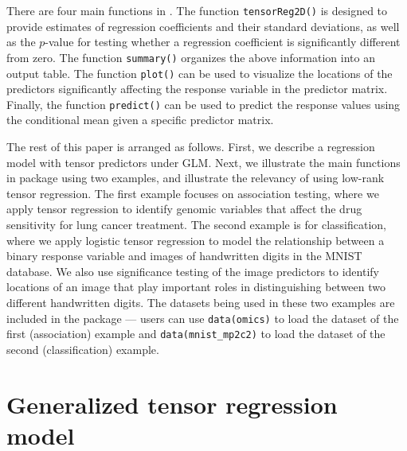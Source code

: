 There are four main functions in . The function
\texttt{tensorReg2D()} is designed to provide estimates of regression
coefficients and their standard deviations, as well as the \(p\)-value
for testing whether a regression coefficient is significantly different
from zero. The function \texttt{summary()} organizes the above
information into an output table. The function \texttt{plot()} can be
used to visualize the locations of the predictors significantly
affecting the response variable in the predictor matrix. Finally, the
function \texttt{predict()} can be used to predict the response values
using the conditional mean given a specific predictor matrix.

The rest of this paper is arranged as follows. First, we describe a
regression model with tensor predictors under GLM. Next, we illustrate
the main functions in package  using two examples,
and illustrate the relevancy of using low-rank tensor regression. The
first example focuses on association testing, where we apply tensor
regression to identify genomic variables that affect the drug
sensitivity for lung cancer treatment. The second example is for
classification, where we apply logistic tensor regression to model the
relationship between a binary response variable and images of
handwritten digits in the MNIST database. We also use significance
testing of the image predictors to identify locations of an image that
play important roles in distinguishing between two different handwritten
digits. The datasets being used in these two examples are included in
the package  --- users can use
\texttt{data(omics)} to load the dataset of the first (association)
example and \texttt{data(mnist\_mp2c2)} to load the dataset of the
second (classification) example.

\hypertarget{generalized-tensor-regression-model}{%
\section{Generalized tensor regression
model}\label{generalized-tensor-regression-model}}

